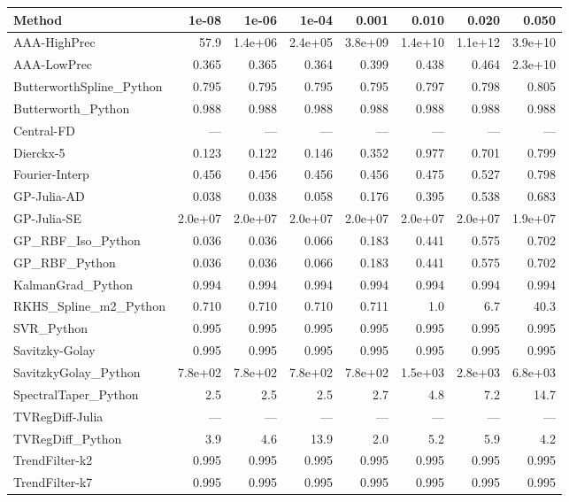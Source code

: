 \begin{longtable}{lrrrrrrr}
\toprule
\textbf{Method} & \textbf{1e-08} & \textbf{1e-06} & \textbf{1e-04} & \textbf{0.001} & \textbf{0.010} & \textbf{0.020} & \textbf{0.050} \\
\midrule
\endhead
AAA-HighPrec & 57.9 & 1.4e+06 & 2.4e+05 & 3.8e+09 & 1.4e+10 & 1.1e+12 & 3.9e+10 \\
AAA-LowPrec & 0.365 & 0.365 & 0.364 & 0.399 & 0.438 & 0.464 & 2.3e+10 \\
ButterworthSpline\_Python & 0.795 & 0.795 & 0.795 & 0.795 & 0.797 & 0.798 & 0.805 \\
Butterworth\_Python & 0.988 & 0.988 & 0.988 & 0.988 & 0.988 & 0.988 & 0.988 \\
Central-FD & --- & --- & --- & --- & --- & --- & --- \\
Dierckx-5 & 0.123 & 0.122 & 0.146 & 0.352 & 0.977 & 0.701 & 0.799 \\
Fourier-Interp & 0.456 & 0.456 & 0.456 & 0.456 & 0.475 & 0.527 & 0.798 \\
GP-Julia-AD & 0.038 & 0.038 & 0.058 & 0.176 & 0.395 & 0.538 & 0.683 \\
GP-Julia-SE & 2.0e+07 & 2.0e+07 & 2.0e+07 & 2.0e+07 & 2.0e+07 & 2.0e+07 & 1.9e+07 \\
GP\_RBF\_Iso\_Python & 0.036 & 0.036 & 0.066 & 0.183 & 0.441 & 0.575 & 0.702 \\
GP\_RBF\_Python & 0.036 & 0.036 & 0.066 & 0.183 & 0.441 & 0.575 & 0.702 \\
KalmanGrad\_Python & 0.994 & 0.994 & 0.994 & 0.994 & 0.994 & 0.994 & 0.994 \\
RKHS\_Spline\_m2\_Python & 0.710 & 0.710 & 0.710 & 0.711 & 1.0 & 6.7 & 40.3 \\
SVR\_Python & 0.995 & 0.995 & 0.995 & 0.995 & 0.995 & 0.995 & 0.995 \\
Savitzky-Golay & 0.995 & 0.995 & 0.995 & 0.995 & 0.995 & 0.995 & 0.995 \\
SavitzkyGolay\_Python & 7.8e+02 & 7.8e+02 & 7.8e+02 & 7.8e+02 & 1.5e+03 & 2.8e+03 & 6.8e+03 \\
SpectralTaper\_Python & 2.5 & 2.5 & 2.5 & 2.7 & 4.8 & 7.2 & 14.7 \\
TVRegDiff-Julia & --- & --- & --- & --- & --- & --- & --- \\
TVRegDiff\_Python & 3.9 & 4.6 & 13.9 & 2.0 & 5.2 & 5.9 & 4.2 \\
TrendFilter-k2 & 0.995 & 0.995 & 0.995 & 0.995 & 0.995 & 0.995 & 0.995 \\
TrendFilter-k7 & 0.995 & 0.995 & 0.995 & 0.995 & 0.995 & 0.995 & 0.995 \\

\end{longtable}
